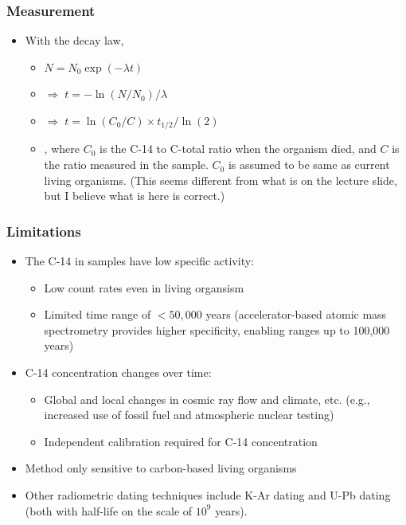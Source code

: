 \subsubsection{Measurement}
\begin{itemize}
    \item With the decay law,
    \begin{itemize}
        \item[] $N=N_0\exp(-\lambda t)$
        \item[] $\Rightarrow\;t=-\ln(N/N_0)/\lambda$
        \item[] $\Rightarrow\;t=\ln(C_0/C)\times t_{1/2}/\ln(2)$
        \item[] , where $C_0$ is the C-14 to C-total ratio when the organism died, and $C$ is the ratio measured in the sample. $C_0$ is assumed to be same as current living organisms. (This seems different from what is on the lecture slide, but I believe what is here is correct.)
    \end{itemize}
\end{itemize}
\subsubsection{Limitations}
\begin{itemize}
    \item The C-14 in samples have low specific activity:
    \begin{itemize}
        \item Low count rates even in living organsism
        \item Limited time range of $<50,000$ years (accelerator-based atomic mass spectrometry provides higher specificity, enabling ranges up to 100,000 years)
    \end{itemize}
    \item C-14 concentration changes over time:
    \begin{itemize}
        \item Global and local changes in cosmic ray flow and climate, etc. (e.g., increased use of fossil fuel and atmospheric nuclear testing)
        \item Independent calibration required for C-14 concentration
    \end{itemize}
    \item Method only sensitive to carbon-based living organisms
    \item Other radiometric dating techniques include K-Ar dating and U-Pb dating (both with half-life on the scale of $10^{9}$ years).
\end{itemize}

